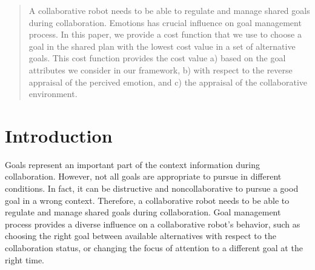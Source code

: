 \documentclass[conference]{IEEEtran}
\begin{document}




\maketitle

\begin{abstract}
A collaborative robot needs to be able to regulate and manage shared goals
during collaboration. Emotions has crucial influence on goal management process.
In this paper, we provide a cost function that we use to choose a goal in the
shared plan with the lowest cost value in a set of alternative goals. This cost
function provides the cost value a) based on the goal attributes we consider in
our framework, b) with respect to the reverse appraisal of the percived emotion,
and c) the appraisal of the collaborative environment.
\end{abstract}





%
\IEEEpeerreviewmaketitle

\vspace*{-2mm}
\section{Introduction}


Goals represent an important part of the context information during
collaboration. However, not all goals are appropriate to pursue in different
conditions. In fact, it can be distructive and noncollaborative to pursue a good
goal in a wrong context. Therefore, a collaborative robot needs to be able to
regulate and manage shared goals during collaboration. Goal management process
provides a diverse influence on a collaborative robot's behavior, such as
choosing the right goal between available alternatives with respect to the
collaboration status, or changing the focus of attention to a different goal at
the right time.
\end{document}
